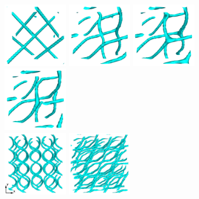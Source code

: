 \documentclass[aps,pre,reprint,superscriptaddress, twocolumn]{revtex4}
\begin{document}
\begin{figure}[htpb]
\includegraphics[width=0.245\textwidth]{disc-xy-10k_run1115.png}
\includegraphics[width=0.245\textwidth]{disc-xy-180k_run1115.png}
\includegraphics[width=0.245\textwidth]{disc-xy-200k_run1115.png}
\includegraphics[width=0.245\textwidth]{disc-xy-210k_run1115.png}\\
\includegraphics[width=0.245\textwidth]{disc-xy-400k_run1115.png}
\includegraphics[width=0.245\textwidth]{disc-xy-700k_run1115.png}

\end{figure}
\end{document}
